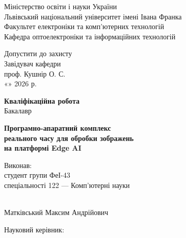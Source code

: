 \documentclass[14pt,a4paper]{extreport}
\begin{document}

\begin{titlepage}

\begin{center}

Міністерство освіти і науки України\\
Львівський національний університет імені Івана Франка\\
Факультет електроніки та комп’ютерних технологій\\
Кафедра оптоелектроніки та інформаційних технологій

\vspace{3cm}

Допустити до захисту\\
Завідувач кафедри\\
\underline{\hspace{5cm}} проф. Кушнір О. С.\\
«\underline{\hspace{1cm}}» \underline{\hspace{3cm}} 2026 р.

\vspace{3cm}

{\Large \textbf{Кваліфікаційна робота}}\\[0.3cm]
{\large Бакалавр}

\vspace{2cm}

{\Large \textbf{Програмно-апаратний комплекс\\
реального часу для обробки зображень\\
на платформі Edge AI}}

\vfill

\begin{flushright}

Виконав:\\
студент групи ФеІ-43\\
спеціальності 122 --- Комп'ютерні науки\\

\vspace{0.5cm}

\underline{\hspace{5cm}}\\
Матківський Максим Андрійович

\vspace{1cm}

Науковий керівник:\\


\end{flushright}
\end{center}
\end{titlepage}
\end{document}
